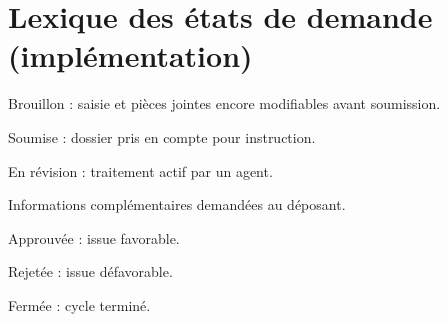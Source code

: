 \vspace{1cm}

\section*{Lexique des états de demande (implémentation)}

\begin{description}[style=nextline,leftmargin=0.8cm]
  \item[\texttt{DRAFT}] Brouillon : saisie et pièces jointes encore modifiables avant soumission.
  \item[\texttt{SUBMITTED}] Soumise : dossier pris en compte pour instruction.
  \item[\texttt{IN\_REVIEW}] En révision : traitement actif par un agent.
  \item[\texttt{NEEDS\_INFO}] Informations complémentaires demandées au déposant.
  \item[\texttt{APPROVED}] Approuvée : issue favorable.
  \item[\texttt{REJECTED}] Rejetée : issue défavorable.
  \item[\texttt{CLOSED}] Fermée : cycle terminé.
\end{description}
